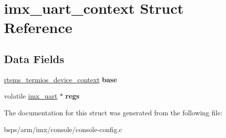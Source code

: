 \hypertarget{structimx__uart__context}{}\section{imx\+\_\+uart\+\_\+context Struct Reference}
\label{structimx__uart__context}
\subsection*{Data Fields}
\begin{DoxyCompactItemize}
\item 
\mbox{\label{structimx__uart__context_afd60f449969d1690aadec5e39b4ca342}} 
\mbox{\hyperlink{structrtems__termios__device__context}{rtems\+\_\+termios\+\_\+device\+\_\+context}} {\bfseries base}
\item 
\mbox{\label{structimx__uart__context_add841958c0dca255958c14aff90c4fc6}} 
volatile \mbox{\hyperlink{structimx__uart}{imx\+\_\+uart}} $\ast$ {\bfseries regs}
\end{DoxyCompactItemize}


The documentation for this struct was generated from the following file\+:\begin{DoxyCompactItemize}
\item 
bsps/arm/imx/console/console-\/config.\+c\end{DoxyCompactItemize}
